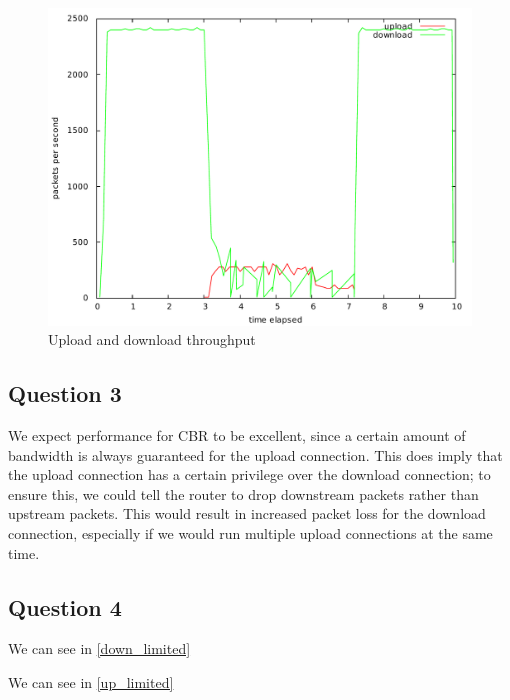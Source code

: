 \documentclass[10pt,a4paper]{article}
\begin{document}
\begin{figure}[p]
    \centering
    \includegraphics[width=\textwidth]{../part1/q2/plots/2.pdf}
    \caption{Upload and download throughput}
    \label{fig:combined1}
\end{figure}
\subsection{Question 3}

We expect performance for CBR to be excellent, since a certain amount
of bandwidth is always guaranteed for the upload connection. This does
imply that the upload connection has a certain privilege over the
download connection; to ensure this, we could tell the router to drop
downstream packets rather than upstream packets. This would result in
increased packet loss for the download connection, especially if we
would run multiple upload connections at the same time.

\subsection{Question 4}

We can see in \ref{down_limited}

We can see in \ref{up_limited}
\end{document}
